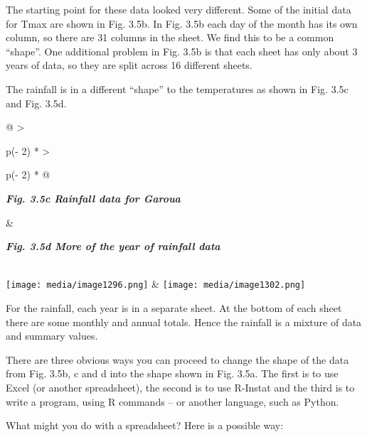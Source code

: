 \documentclass[
  letterpaper,
  DIV=11,
  numbers=noendperiod]{scrreprt}
\begin{document}
The starting point for these data looked very different. Some of the
initial data for Tmax are shown in Fig. 3.5b. In Fig. 3.5b each day of
the month has its own column, so there are 31 columns in the sheet. We
find this to be a common ``shape''. One additional problem in Fig. 3.5b
is that each sheet has only about 3 years of data, so they are split
across 16 different sheets.

The rainfall is in a different ``shape'' to the temperatures as shown in
Fig. 3.5c and Fig. 3.5d.

\begin{longtable}[]{@{}
  >{\raggedright\arraybackslash}p{(\columnwidth - 2\tabcolsep) * }
  >{\raggedright\arraybackslash}p{(\columnwidth - 2\tabcolsep) * }@{}}
\toprule\noalign{}
\begin{minipage}[b]{\linewidth}\raggedright
\textbf{\emph{Fig. 3.5c Rainfall data for Garoua}}
\end{minipage} & \begin{minipage}[b]{\linewidth}\raggedright
\textbf{\emph{Fig. 3.5d More of the year of rainfall data}}
\end{minipage} \\
\midrule\noalign{}
\endhead
\bottomrule\noalign{}
\endlastfoot
\texttt{[image: media/image1296.png]}
&
\texttt{[image: media/image1302.png]} \\
\end{longtable}

For the rainfall, each year is in a separate sheet. At the bottom of
each sheet there are some monthly and annual totals. Hence the rainfall
is a mixture of data and summary values.

There are three obvious ways you can proceed to change the shape of the
data from Fig. 3.5b, c and d into the shape shown in Fig. 3.5a. The
first is to use Excel (or another spreadsheet), the second is to use
R-Instat and the third is to write a program, using R commands -- or
another language, such as Python.

What might you do with a spreadsheet? Here is a possible way:
\end{document}
